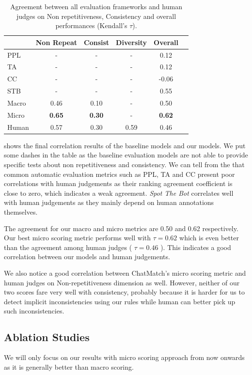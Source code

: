 \begin{table}[th!]
\centering
\small
\begin{tabular}{lccccc}
\toprule
 & Non Repeat & Consist &Diversity & Overall \\ \midrule
PPL & -  &- &- &0.12   \\
TA&-  &- &- &0.12 \\
CC&- &- &- &-0.06\\
STB &- &- &-&0.55 \\
Macro& 0.46& 0.10&-&0.50\\ 
Micro&\textbf{0.65} &\textbf{0.30}&-&\textbf{0.62} \\\midrule
Human & 0.57 &  0.30  &0.59 & 0.46\\ 
 \bottomrule
\end{tabular}
\caption{Agreement between all evaluation frameworks and 
human judges on Non repetitiveness, Consistency and 
overall performances (Kendall's $\tau$). }
\label{tab:main}
\end{table}

 shows the final correlation results of the baseline models and our models. We put some dashes in the table as the baseline evaluation models are not able to provide specific tests about non repetitiveness and consistency. We can tell from the  that common automatic evaluation metrics such as PPL, TA and CC present poor correlations 
with human judgements as their ranking agreement coefficient is close to zero, 
which indicates a weak agreement. \textit{Spot The Bot} correlates well with human judgements as they 
mainly depend on human annotations themselves.

The agreement for our macro and micro metrics are 0.50 and  0.62 respectively. Our best micro scoring metric performs well with $\tau = 0.62$ which is even better than the agreement among human judges ( $\tau = 0.46$ ). This indicates a good correlation between our models and human judgements. 

We also notice a good correlation between ChatMatch's micro scoring metric
and human judges on Non-repetitiveness dimension as 
well. However, neither of our two scores fare very well with
consistency, probably because it is harder for us to 
detect implicit inconsistencies using our rules while human can better pick up such inconsistencies.
\subsection{Ablation Studies}
We will only focus on our results with micro scoring approach 
from now onwards as it is generally better than macro scoring.

